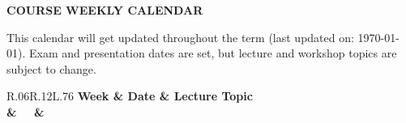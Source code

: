 \documentclass[11pt]{article}
\begin{document}
\begin{minipage}{\textwidth}
	\begin{center}
		\textbf{COURSE WEEKLY CALENDAR}
	\end{center}

	This calendar will get updated throughout the term (last updated on: {\color{myred}\monthdayyeardate\today}). Exam and presentation dates are set, but lecture and workshop topics are subject to change.

	\begin{tabular}{R{.06\linewidth}R{.12\linewidth}L{.76\linewidth}}
		\bfseries Week & \bfseries Date           & \bfseries \hfill Lecture Topic                                                  \\
		{\bfseries \wk & \bfseries \dy~\mn~\daten & {\color{\subtcolor}\textbf{\subt}}\dotfill{\color{\subtcolor}\textbf{\ltopic}}}
	\end{tabular}

\end{minipage}

\clearpage


\end{document}
